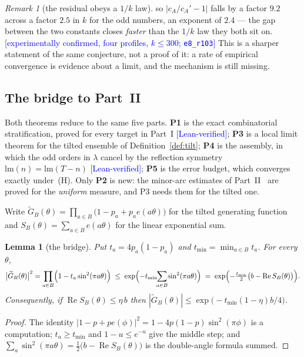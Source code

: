\documentclass[11pt,a4paper]{article}
\theoremstyle{plain}
\newtheorem{lemma}[theorem]{Lemma}
\theoremstyle{definition}
\theoremstyle{remark}
\newtheorem{remark}[theorem]{Remark}
\newcommand{\lm}{\mathrm{lm}}
\newcommand{\STATUS}[1]{\textcolor{blue}{\textsf{[#1]}}}
\begin{document}
\begin{remark}[the residual obeys a $1/k$ law]
\noindent
so $|c_A/c_A'-1|$ falls by a factor $9.2$ across a factor $2.5$ in $k$ for the odd numbers, an
exponent of $2.4$ --- the gap between the two constants closes \emph{faster} than the $1/k$
law they both sit on. \STATUS{experimentally confirmed, four profiles, $k\le300$;
\texttt{e8\_r103}} This is a sharper statement of the same conjecture, not a proof of it: a
rate of empirical convergence is evidence about a limit, and the mechanism is still missing.
\end{remark}

\subsection{The bridge to Part~II}\label{sec:bridge}

Both theorems reduce to the same five parts. \textbf{P1} is the exact combinatorial
stratification, proved for every target in Part~I \STATUS{Lean-verified}; \textbf{P3} is a
local limit theorem for the tilted ensemble of Definition~\ref{def:tilt}; \textbf{P4} is the
assembly, in which the odd orders in $\lambda$ cancel by the reflection symmetry
$\lm(n)=\lm(T-n)$ \STATUS{Lean-verified}; \textbf{P5} is the error budget, which converges
exactly under~(H). Only \textbf{P2} is new: the minor-arc estimates of Part~II~\cite{P2} are proved for
the \emph{uniform} measure, and P3 needs them for the tilted one.

Write $\widetilde G_B(\theta)=\prod_{a\in B}\bigl(1-p_a+p_ae(a\theta)\bigr)$ for the tilted
generating function and $S_B(\theta)=\sum_{a\in B}e(a\theta)$ for the linear exponential sum.

\begin{lemma}[the bridge]\label{lem:kappa}
Put $t_a=4p_a(1-p_a)$ and $t_{\min}=\min_{a\in B}t_a$. For every $\theta$,
\[
  \bigl|\widetilde G_B(\theta)\bigr|^{2}
  =\prod_{a\in B}\Bigl(1-t_a\sin^{2}(\pi a\theta)\Bigr)
  \;\le\;\exp\Bigl(-t_{\min}\!\!\sum_{a\in B}\!\sin^{2}(\pi a\theta)\Bigr)
  \;=\;\exp\Bigl(-\tfrac{t_{\min}}{2}\bigl(b-\operatorname{Re}S_B(\theta)\bigr)\Bigr).
\]
Consequently, if $\operatorname{Re}S_B(\theta)\le\eta\,b$ then
$|\widetilde G_B(\theta)|\le\exp\bigl(-t_{\min}(1-\eta)b/4\bigr)$.
\end{lemma}

\begin{proof}
The identity $|1-p+pe(\phi)|^{2}=1-4p(1-p)\sin^{2}(\pi\phi)$ is a computation;
$t_a\ge t_{\min}$ and $1-u\le e^{-u}$ give the middle step; and
$\sum_a\sin^{2}(\pi a\theta)=\tfrac12\bigl(b-\operatorname{Re}S_B(\theta)\bigr)$ is the
double-angle formula summed.
\end{proof}
\end{document}
